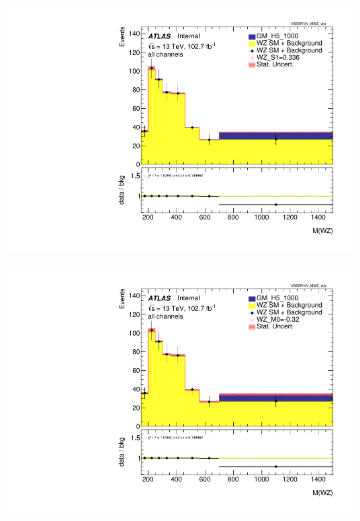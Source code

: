 \documentclass[../Bachelorarbeit.tex]{subfiles}
\begin{document}
\begin{figure}[h]

    \centering
    \begin{subfigure}{0.35\textwidth}
        \includegraphics[width=\textwidth]{Plots/ALL_MWZ_right_color/GM_H5_1000/S1/2022-05-07/VBSSR/all_VV_MWZ_vbs.pdf}
    \end{subfigure}
    \begin{subfigure}{0.35\textwidth}
        \includegraphics[width=\textwidth]{Plots/ALL_MWZ_right_color/GM_H5_1000/M0/2022-05-07/VBSSR/all_VV_MWZ_vbs.pdf}
    \end{subfigure}
    \begin{subfigure}{0.35\textwidth}

\end{subfigure}
\end{figure}
\end{document}
